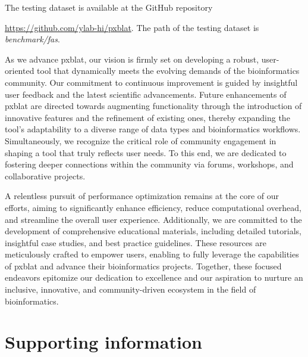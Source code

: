 \documentclass[10pt,letterpaper]{article}
\begin{document}
The testing dataset is available at the GitHub repository {\url{https://github.com/ylab-hi/pxblat}.
The path of the testing dataset is \emph{benchmark/fas}.


As we advance \gls{pxblat}, our vision is firmly set on developing a robust, user-oriented tool that dynamically meets the evolving demands of the bioinformatics community.
Our commitment to continuous improvement is guided by insightful user feedback and the latest scientific advancements. Future enhancements of \gls{pxblat} are directed towards augmenting functionality through the introduction of innovative features and the refinement of existing ones, thereby expanding the tool's adaptability to a diverse range of data types and bioinformatics workflows.
Simultaneously, we recognize the critical role of community engagement in shaping a tool that truly reflects user needs. To this end, we are dedicated to fostering deeper connections within the community via forums, workshops, and collaborative projects.

A relentless pursuit of performance optimization remains at the core of our efforts, aiming to significantly enhance efficiency, reduce computational overhead, and streamline the overall user experience.
Additionally, we are committed to the development of comprehensive educational materials, including detailed tutorials, insightful case studies, and best practice guidelines.
These resources are meticulously crafted to empower users, enabling to fully leverage the capabilities of \gls{pxblat} and advance their bioinformatics projects.
Together, these focused endeavors epitomize our dedication to excellence and our aspiration to nurture an inclusive, innovative, and community-driven ecosystem in the field of bioinformatics.

%


\section*{Supporting information}

}
\end{document}
